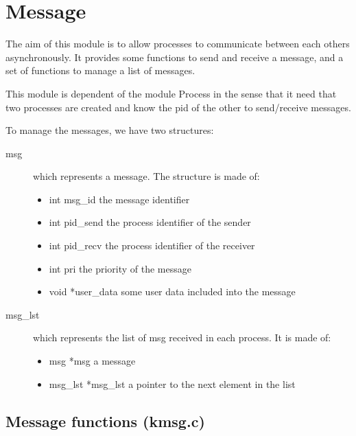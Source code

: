 \section{Message}
The aim of this module is to allow processes to communicate between each
others asynchronously.
It provides some functions to send and receive a message, and a set of
functions to manage a list of messages.

This module is dependent of the module Process in the sense that it need that
two processes are created and know the pid of the other to send/receive messages.

To manage the messages, we have two structures:
\begin{description}
\item[msg] which represents a message. The structure is made of:
\begin{itemize}
  \item{int msg\_id} the message identifier
	 \item{int pid\_send} the process identifier of the sender
	 \item{int pid\_recv} the process identifier of the receiver
	 \item{int pri} the priority of the message
	 \item{void *user\_data} some user data included into the message
  \end{itemize}
\item[msg\_lst] which represents the list of msg received in each process.
  It is made of:
  \begin{itemize}
	 \item{msg *msg} a message
	 \item{msg\_lst *msg\_lst} a pointer to the next element in the list
  \end{itemize}
\end{description}


\subsection{Message functions (kmsg.c)}


